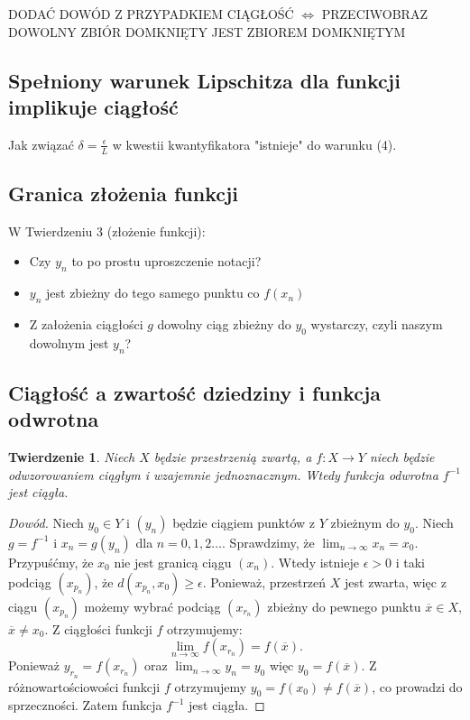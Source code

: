 \documentclass{article}
\newtheorem*{theorem}{Twierdzenie}
\begin{document}
\begin{center}
    DODAĆ DOWÓD Z PRZYPADKIEM CIĄGŁOŚĆ \(\iff\) PRZECIWOBRAZ DOWOLNY ZBIÓR DOMKNIĘTY JEST ZBIOREM DOMKNIĘTYM
\end{center}

\subsection{Spełniony warunek Lipschitza dla funkcji implikuje ciągłość}

Jak związać \(\delta = \frac{\epsilon}{L}\) w kwestii kwantyfikatora "istnieje" do warunku (4).

\subsection{Granica złożenia funkcji}

W Twierdzeniu 3 (złożenie funkcji):

\begin{itemize}
    \item Czy \(y_n\) to po prostu uproszczenie notacji?
    \item \(y_n\) jest zbieżny do tego samego punktu co \(f(x_n)\)
    \item Z założenia ciągłości \(g\) dowolny ciąg zbieżny do \(y_0\) wystarczy, czyli naszym dowolnym jest \(y_n\)?
\end{itemize}

\subsection{Ciągłość a zwartość dziedziny i funkcja odwrotna}

\newpage
\begin{theorem}
    Niech \(X\) będzie przestrzenią zwartą, a \(f: X \to Y\) niech będzie odwzorowaniem
    ciągłym i wzajemnie jednoznacznym. Wtedy funkcja odwrotna \(f^{-1}\) jest ciągła.
\end{theorem}
\begin{proof}[Dowód]
    Niech \(y_0 \in Y\) i \((y_n)\) będzie ciągiem punktów z \(Y\) zbieżnym do \(y_0\).
    Niech \(g = f^{-1}\) i \(x_n = g(y_n)\) dla \(n = 0,1,2 \dots\). Sprawdzimy, że
    \(\lim_{n \to \infty} x_n = x_0\). Przypuśćmy, że \(x_0\) nie jest granicą ciągu \((x_n)\).
    Wtedy istnieje \(\epsilon > 0\) i taki podciąg \((x_{p_n})\), że \(d(x_{p_n}, x_0) \geq \epsilon\).
    Ponieważ, przestrzeń \(X\) jest zwarta, więc z ciągu \((x_{p_n})\) możemy wybrać podciąg \((x_{r_n})\)
    zbieżny do pewnego punktu \(\overline{x} \in X\), \(\overline{x} \neq x_0\). Z ciągłości funkcji
    \(f\) otrzymujemy:
    \begin{equation*}
        \lim_{n \to \infty} f(x_{r_n}) = f(\overline{x}).
    \end{equation*}
    Ponieważ \(y_{r_n} = f(x_{r_n})\) oraz \(\lim_{n \to \infty} y_n = y_0\) więc \(y_0 = f(\overline{x})\).
    Z różnowartościowości funkcji \(f\) otrzymujemy \(y_0 = f(x_0) \neq f(\overline{x})\), co prowadzi
    do sprzeczności. Zatem funkcja \(f^{-1}\) jest ciągła.
\end{proof}
\end{document}

